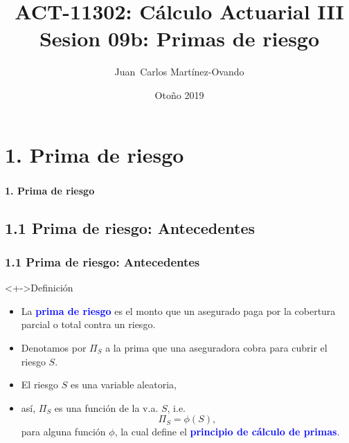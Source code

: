 \documentclass[cjk,t,compress]{beamer}
\title[C\'alculo Actuarial III]
{	ACT-11302: C\'alculo Actuarial III\\
	{\large Sesion 09b: Primas de riesgo}
}
\author[Mart\'inez-Ovando]{
{	\footnotesize
	\textcolor{MyDarkGreen}{Juan~Carlos Mart\'inez-Ovando}}
}
\institute[ITAM]
{	\textcolor{MyDarkGrey}{
	ITAM}
}
\date[ ] %
{	\scriptsize
	\textcolor{MyDarkGrey}{Oto\~no 2019}
}
\begin{document}
\sffamily
\begin{frame}[fragile]
	\frametitle{}
	\titlepage
\end{frame}

%
%
\section{1. Prima de riesgo}
\begin{frame}[fragile]
	\frametitle{}
	\vspace{5.5cm}
	\begin{flushright}
		\textcolor{MyDarkBlue}{\Large \bf 1. Prima de riesgo}
	\end{flushright}
\end{frame}

%
%
\subsection{1.1 Prima de riesgo: Antecedentes}
\begin{frame}[fragile]
	\frametitle{1.1 Prima de riesgo: Antecedentes}
	\scriptsize  	
		
		\vspace{0.4cm}
		\begin{block}<+->{Definici\'on}
		\vspace{0.3cm}
		\begin{itemize}
		 \item La \textcolor{blue}{\bf prima de riesgo} es el monto que un asegurado paga por la cobertura parcial o total contra un riesgo.
		
		 \item Denotamos por $\Pi_S$ a la prima que una aseguradora cobra para cubrir el riesgo $S$.
		 \item El riesgo $S$ es una variable aleatoria,
		 
		 \item[] as\'i, $\Pi_S$ es una funci\'on de la v.a. $S$, i.e.
		\begin{equation}
			\Pi_S=\phi(S),
			\nonumber
		\end{equation}
		para alguna funci\'on $\phi$, la cual define el \textcolor{blue}{\bf principio de c\'alculo de primas}.
		\end{itemize}
		\end{block}  		
				
\end{frame}
\end{document}
